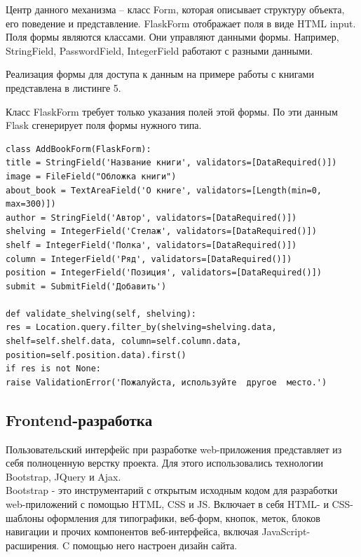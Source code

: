 \documentclass[12pt]{article}
\begin{document}
Центр данного механизма – класс Form, которая описывает структуру объекта, его поведение и представление. 
FlaskForm отображает поля в виде HTML \<input\>. Поля формы являются классами. Они управляют данными формы. Например, StringField, PasswordField, IntegerField работают с разными данными.

Реализация формы для доступа к данным на примере работы с книгами представлена в листинге 5.

Класс FlaskForm требует только указания полей этой формы. По эти данным Flask сгенерирует поля формы нужного типа.

\begin{lstlisting}[label=some-code, caption=Форма добавления книги]
class AddBookForm(FlaskForm):
title = StringField('Название книги', validators=[DataRequired()])
image = FileField("Обложка книги")
about_book = TextAreaField('О книге', validators=[Length(min=0, max=300)])
author = StringField('Автор', validators=[DataRequired()])
shelving = IntegerField('Стелаж', validators=[DataRequired()])
shelf = IntegerField('Полка', validators=[DataRequired()])
column = IntegerField('Ряд', validators=[DataRequired()])
position = IntegerField('Позиция', validators=[DataRequired()])
submit = SubmitField('Добавить')

def validate_shelving(self, shelving):
res = Location.query.filter_by(shelving=shelving.data, shelf=self.shelf.data, column=self.column.data, position=self.position.data).first()
if res is not None:
raise ValidationError('Пожалуйста, используйте  другое  место.')
\end{lstlisting}



\subsection{Frontend-разработка}%
\setcounter{subsection}{4}

Пользовательский интерфейс при разработке web-приложения представляет из себя полноценную верстку проекта. Для этого использовались технологии Bootstrap, JQuery и Ajax. \\

Bootstrap - это инструментарий с открытым исходным кодом для разработки web-приложений с помощью HTML, CSS и JS. Включает в себя HTML- и CSS-шаблоны оформления для типографики, веб-форм, кнопок, меток, блоков навигации и прочих компонентов веб-интерфейса, включая JavaScript-расширения. C помощью него настроен дизайн сайта.  \cite{3} \\
\end{document}
